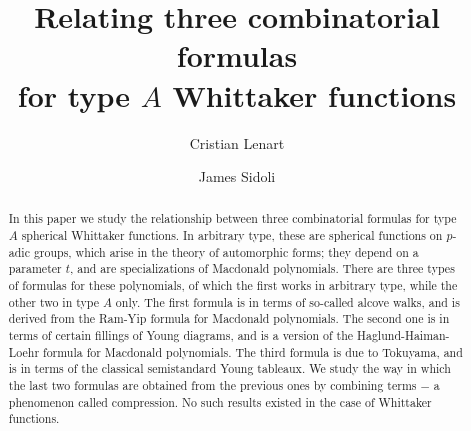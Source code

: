 \documentclass[11pt]{amsart}
\title[Combinatorial formulas for type $A$ Whittaker functions]{Relating three combinatorial formulas \\for type $A$ Whittaker functions}
\author[C.~Lenart]{Cristian Lenart}
\author[J.~Sidoli]{James Sidoli}
\begin{document}
\begin{abstract} 
In this paper we study the relationship between three combinatorial formulas for type $A$ spherical Whittaker functions. In arbitrary type, these are spherical functions on $p$-adic groups, which arise in the theory of automorphic forms; they depend on a parameter $t$, and are specializations of Macdonald polynomials. There are three types of formulas for these polynomials, of which the first works in arbitrary type, while the other two in type $A$ only. The first formula is in terms of so-called alcove walks, and is derived from the Ram-Yip formula for Macdonald polynomials. The second one is in terms of certain fillings of Young diagrams, and is a version of the Haglund-Haiman-Loehr formula for Macdonald polynomials. The third formula is due to Tokuyama, and is in terms of the classical semistandard Young tableaux. We study the way in which the last two formulas are obtained from the previous ones by combining terms $-$ a phenomenon called compression. No such results existed in the case of Whittaker functions.
\end{abstract}

\maketitle
\end{document}
